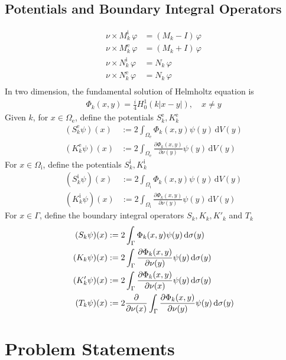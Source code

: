 \subsection{Potentials and Boundary Integral Operators}

\begin{align*}
  \nu\times M_k^\text{i}\,\varphi &= (M_k - I)\,\varphi\\
  \nu\times M_k^\text{e}\,\varphi &= (M_k + I)\,\varphi\\
  \nu\times N_k^\text{i}\,\varphi &= N_k\,\varphi\\
  \nu\times N_k^\text{e}\,\varphi &= N_k\,\varphi\\
\end{align*}
In two dimension, the fundamental solution of Helmholtz equation is
\begin{align*}
  \Phi_k(x, y) = \frac{i}{4} H^1_0(k|x-y|), \quad x\not= y
\end{align*}
Given $k$, for $x\in\Omega_{\text{e}}$, define the potentials $S_k^\text{e}, K_k^\text{e}$ 
\begin{align*}
  (S_k^\text{e}\psi)(x) &:= 2\int_{\Omega_{\text{e}}}\Phi_k(x, y)\psi(y)\,\text{d}V(y) \\
  (K_k^\text{e}\psi)(x) &:= 2\int_{\Omega_\text{e}}\frac{\partial\Phi_k(x, y)}{\partial\nu(y)}\psi(y)\,\text{d}V(y) 
\end{align*}
For $x\in\Omega_{\text{i}}$, define the potentials $S_k^\text{i}, K_k^\text{i}$ 
\begin{align*}
  (S_k^\text{i}\psi)(x) &:= 2\int_{\Omega_{\text{i}}}\Phi_k(x, y)\psi(y)\,\text{d}V(y) \\
  (K_k^\text{i}\psi)(x) &:= 2\int_{\Omega_\text{i}}\frac{\partial\Phi_k(x, y)}{\partial\nu(y)}\psi(y)\,\text{d}V(y) 
\end{align*}
For $x\in\Gamma$, define the boundary integral operators $S_k, K_k, K'_k$ and $T_k$ 
\begin{align*}
  (S_k\psi)(x) &:= 2\int_{\Gamma}\Phi_k(x, y)\psi(y)\,\text{d}\sigma(y) \\
  (K_k\psi)(x) &:= 2\int_{\Gamma}\frac{\partial\Phi_k(x, y)}{\partial\nu(y)}\psi(y)\,\text{d}\sigma(y) \\
  (K'_k\psi)(x) &:= 2\int_{\Gamma}\frac{\partial\Phi_k(x, y)}{\partial\nu(x)}\psi(y)\,\text{d}\sigma(y) \\
  (T_k\psi)(x) &:= 2\frac{\partial}{\partial\nu(x)}\int_{\Gamma}\frac{\partial\Phi_k(x, y)}{\partial\nu(y)}\psi(y)\,\text{d}\sigma(y)
\end{align*}

\section{Problem Statements}
